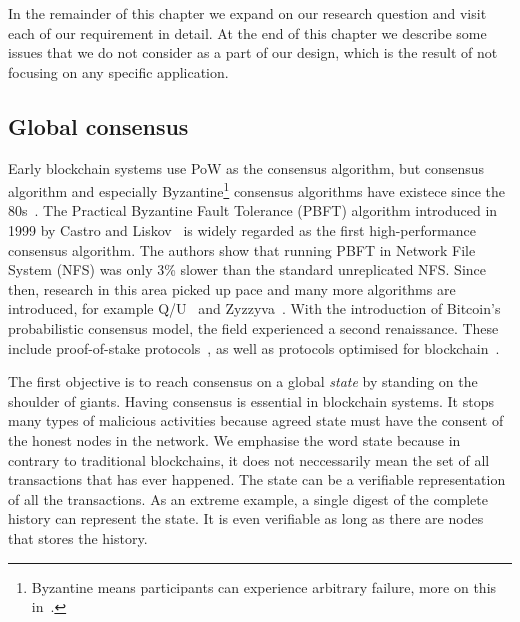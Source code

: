 In the remainder of this chapter we expand on our research question and visit each of our requirement in detail.
At the end of this chapter we describe some issues that we do not consider as a part of our design,
which is the result of not focusing on any specific application.

\subsection{Global consensus}


Early blockchain systems use PoW as the consensus algorithm,
but consensus algorithm and especially Byzantine\footnote{Byzantine means participants can experience arbitrary failure, more on this in~.}
consensus algorithms have existece since the 80s~\cite{pease1980reaching, lamport1982byzantine}.
The Practical Byzantine Fault Tolerance (PBFT) algorithm introduced in 1999 by Castro and Liskov~\cite{castro1999practical} is widely regarded as the first high-performance consensus algorithm.
The authors show that running PBFT in Network File System (NFS) was only 3\% slower than the standard unreplicated NFS.
Since then, research in this area picked up pace and many more algorithms are introduced, for example Q/U~\cite{abd2005fault} and Zyzzyva~\cite{kotla2007zyzzyva}.
With the introduction of Bitcoin's probabilistic consensus model, the field experienced a second renaissance.
These include proof-of-stake protocols~\cite{bentov2016snow, micali2016algorand}, as well as protocols optimised for blockchain~\cite{liu2016xft, miller2016honey}.

The first objective is to reach consensus on a global \emph{state} by standing on the shoulder of giants.
Having consensus is essential in blockchain systems.
It stops many types of malicious activities because agreed state must have the consent of the honest nodes in the network.
We emphasise the word state because in contrary to traditional blockchains,
it does not neccessarily mean the set of all transactions that has ever happened.
The state can be a verifiable representation of all the transactions.
As an extreme example, a single digest of the complete history can represent the state.
It is even verifiable as long as there are nodes that stores the history.

